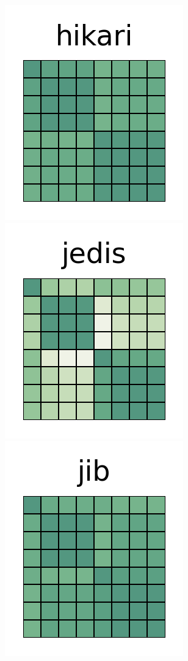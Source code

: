 \documentclass[10pt,conference]{IEEEtran}
\begin{document}
\begin{figure}[htb!]
 \includegraphics[width=\heatmapWidth, keepaspectratio]{entropy-correlations/hikaricp-grids.png} \\
 \includegraphics[width=\heatmapWidth, keepaspectratio]{entropy-correlations/jedis-grids.png}
 \includegraphics[width=\heatmapWidth, keepaspectratio]{entropy-correlations/jib-grids.png}

\end{figure}
\end{document}
